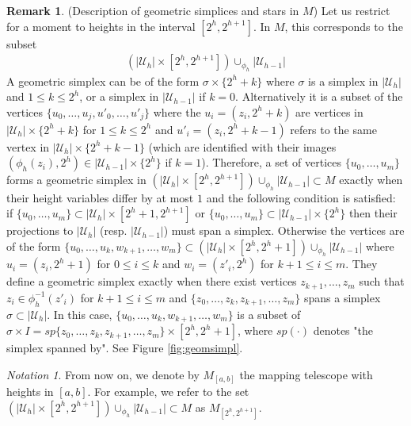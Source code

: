 \documentclass[a4paper,11pt]{article}
\theoremstyle{definition}
\newtheorem*{remark}{Remark}
\theoremstyle{plain}
\theoremstyle{remark}
\newtheorem*{notation}{Notation}
\begin{document}
\begin{remark} (Description of geometric simplices and stars in $M$) Let us restrict for a moment to heights in the interval $[2^h, 2^{h+1}]$. In $M$, this corresponds to the subset
\begin{align*}
(|\mathcal{U}_{h}| \times [2^h,2^{h+1}]) \cup_{\phi_{h}} |\mathcal{U}_{h-1}|
\end{align*}
A geometric simplex can be of the form $\sigma \times \{2^{h}+k \}$ where $\sigma$ is a simplex in $|\mathcal{U}_{h}|$ and $1\leq k\leq 2^h$, or a simplex in $|\mathcal{U}_{h-1}|$ if $k=0$. Alternatively it is a subset of the vertices $\{u_0,\dots, u_j, u'_0, \dots, {u}'_{j}\}$ where the $u_i = (z_i,2^{h} + k)$ are vertices in $|\mathcal{U}_{h}| \times \{2^{h} + k\}$ for $1\leq k\leq 2^{h}$ and $u'_i = (z_i,2^{h} + k-1)$ refers to the same vertex in $|\mathcal{U}_{h}| \times \{2^{h} + k-1\}$ (which are identified with their images $(\phi_{h}(z_i),2^h) \in|\mathcal{U}_{h-1}| \times \{2^{h}\}$ if $k=1$). Therefore, a set of vertices $\{u_0,\dots,u_m\}$ forms a geometric simplex in $(|\mathcal{U}_{h}| \times [2^h,2^{h+1}]) \cup_{\phi_{h}} |\mathcal{U}_{h-1}|\subset M$ exactly when their height variables differ by at most $1$ and the following condition is satisfied: if $\{u_0,\dots,u_m\}\subset |\mathcal{U}_{h}| \times [2^h+1,2^{h+1}]$ or $\{u_0,\dots,u_m\}\subset |\mathcal{U}_{h-1}| \times \{2^h\}$ then their projections to $ |\mathcal{U}_{h}|$ (resp. $|\mathcal{U}_{h-1}|$) must span a simplex. Otherwise the vertices are of the form $\{u_0,\dots,u_k,w_{k+1},\dots,w_m\}\subset  (|\mathcal{U}_{h}| \times [2^h,2^{h}+1]) \cup_{\phi_{h}} |\mathcal{U}_{h-1}|$ where $u_i = (z_i,2^{h}+1)$ for $0\leq i\leq k$ and $w_{i} = (z'_i,2^h)$ for $k+1\leq i\leq m$. They define a geometric simplex exactly when there exist vertices $z_{k+1},\dots, z_m$ such that $z_i\in \phi^{-1}_{h}(z'_i)$ for $k+1\leq i\leq m$ and $\{z_0,\dots,z_k,z_{k+1},\dots,z_m\}$ spans a simplex $\sigma\subset |\mathcal{U}_{h}|$. In this case, $\{u_0,\dots,u_k,w_{k+1},\dots,w_m\}$ is a subset of $\sigma \times I = sp\{z_0,\dots,z_k,z_{k+1},\dots,z_m\} \times [2^h,2^h+1]$, where $sp(\cdot)$ denotes "the simplex spanned by". See Figure \ref{fig:geomsimpl}.\\

\begin{notation} From now on, we denote by $M_{[a,b]}$ the mapping telescope with heights in $[a,b]$. For example, we refer to the set  $(|\mathcal{U}_{h}| \times [2^h,2^{h+1}]) \cup_{\phi_{h}} |\mathcal{U}_{h-1}| \subset M$ as $M_{[2^h,2^{h+1}]}$. 
\end{notation}



\end{remark}
\end{document}
